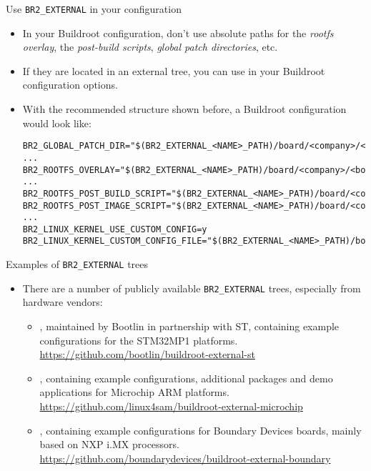 \begin{frame}[fragile]{Use {\tt BR2\_EXTERNAL} in your configuration}

  \begin{itemize}
  \item In your Buildroot configuration, don't use absolute paths for
    the {\em rootfs overlay}, the {\em post-build scripts}, {\em
      global patch directories}, etc.
  \item If they are located in an external tree, you can use
     in your Buildroot configuration
    options.
  \item With the recommended structure shown before, a Buildroot
    configuration would look like:
    \begin{block}{}
{\tiny
\begin{verbatim}
BR2_GLOBAL_PATCH_DIR="$(BR2_EXTERNAL_<NAME>_PATH)/board/<company>/<boardname>/patches/"
...
BR2_ROOTFS_OVERLAY="$(BR2_EXTERNAL_<NAME>_PATH)/board/<company>/<boardname>/rootfs_overlay/"
...
BR2_ROOTFS_POST_BUILD_SCRIPT="$(BR2_EXTERNAL_<NAME>_PATH)/board/<company>/<boardname>/post_build.sh"
BR2_ROOTFS_POST_IMAGE_SCRIPT="$(BR2_EXTERNAL_<NAME>_PATH)/board/<company>/<boardname>/post_image.sh"
...
BR2_LINUX_KERNEL_USE_CUSTOM_CONFIG=y
BR2_LINUX_KERNEL_CUSTOM_CONFIG_FILE="$(BR2_EXTERNAL_<NAME>_PATH)/board/<company>/<boardname>/linux.config"
\end{verbatim}
}
    \end{block}
  \end{itemize}

\end{frame}

\begin{frame}{Examples of {\tt BR2\_EXTERNAL} trees}
  \begin{itemize}
  \item There are a number of publicly available {\tt BR2\_EXTERNAL}
    trees, especially from hardware vendors:
    \begin{itemize}
    \item {}, maintained by Bootlin in
      partnership with ST, containing example configurations for the
      STM32MP1 platforms.\\
      \url{https://github.com/bootlin/buildroot-external-st}
    \item {}, containing example
      configurations, additional packages and demo applications for
      Microchip ARM platforms.\\
      \url{https://github.com/linux4sam/buildroot-external-microchip}
    \item {}, containing example
      configurations for Boundary Devices boards, mainly based on NXP
      i.MX processors.\\
      \url{https://github.com/boundarydevices/buildroot-external-boundary}
    \end{itemize}
  \end{itemize}
\end{frame}

